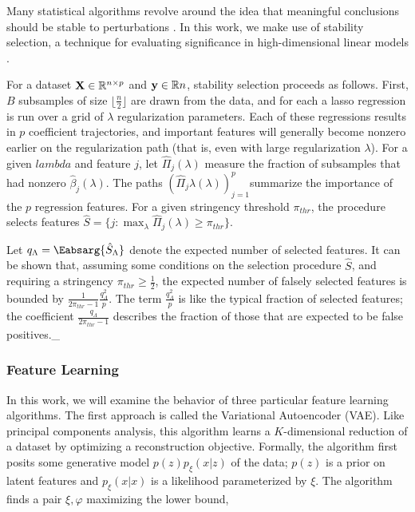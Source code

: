 Many statistical algorithms revolve around the idea that meaningful conclusions should be stable to perturbations \cite{yu2013stability}. In this work, we make use of stability selection, a technique for evaluating significance in high-dimensional linear models \cite{meinshausen2010stability}.

For a dataset $\mathbf{X}\in \mathbb{R}^{n \times p}$ and $\mathbf{y} \in \mathbb{R}{n}$, stability selection proceeds as follows. First, $B$ subsamples of size $\lfloor \frac{n}{2} \rfloor$ are drawn from the data, and for each a lasso regression is run over a grid of $\lambda$ regularization parameters. Each of these regressions results in $p$ coefficient trajectories, and important features will generally become nonzero earlier on the regularization path (that is, even with large regularization $\lambda$). For a given $lambda$ and feature $j$, let $\hat{\Pi}_{j}\left(\lambda\right)$ measure the fraction of subsamples that had nonzero $\hat{\beta}_j\left(\lambda\right)$.  The paths $\left(\hat{\Pi}_{j}\lambda\left(\lambda\right)\right)_{j = 1}^{p}$summarize the importance of the $p$ regression features. For a given stringency threshold $\pi_{thr}$, the procedure selects features $\hat{S} = \{j : \max_{\lambda} \hat{\Pi}_{j}\left(\lambda\right) \geq \pi_{thr}\}$.

Let $q_{\Lambda} = \Eabsarg{\hat{S}_{\Lambda}}$ denote the expected number of
selected features. It can be shown that, assuming some conditions on the
selection procedure $\hat{S}$, and requiring a stringency $\pi_{thr} \geq
\frac{1}{2}$, the expected number of falsely selected features is bounded by
$\frac{1}{2\pi_{thr} - 1} \frac{q_{\Lambda}^2}{p}$. The term
$\frac{q_{\Lambda}^2}{p}$ is like the typical fraction of selected features; the
coefficient $\frac{q_{\Lambda}}{2\pi_{thr} - 1}$ describes the fraction of those
that are expected to be false positives._

\subsubsection{Feature Learning}

In this work, we will examine the behavior of three particular feature learning algorithms. The first approach is called the Variational Autoencoder (VAE). Like principal components analysis, this algorithm learns a $K$-dimensional reduction of a dataset by optimizing a reconstruction objective. Formally, the algorithm first posits some generative model $p\left(z\right)p_{\xi}\left(x \vert z\right)$ of the data; $p\left(z\right)$ is a prior on latent features and $p_{\xi}\left(x \vert x\right)$ is a likelihood parameterized by $\xi$. The algorithm finds a pair $\xi, \varphi$ maximizing the lower bound,

